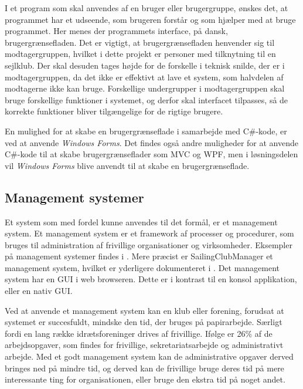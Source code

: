 I et program som skal anvendes af en bruger eller brugergruppe, ønskes det, at programmet har et udseende, som
brugeren forstår og som hjælper med at bruge programmet. Her menes der programmets interface, på dansk,
brugergrænsefladen. Det er vigtigt, at brugergrænsefladen henvender sig til modtagergruppen, hvilket i dette
projekt er personer med tilknytning til en sejlklub. Der skal desuden tages højde for de forskelle i teknisk
snilde, der er i modtagergruppen, da det ikke er effektivt at lave et system, som halvdelen af modtagerne ikke
kan bruge. Forskellige undergrupper i modtagergruppen skal bruge forskellige funktioner i systemet, og derfor
skal interfacet tilpasses, så de korrekte funktioner bliver tilgængelige for de rigtige brugere.

En mulighed for at skabe en brugergrænseflade i samarbejde med C\#-kode, er ved at anvende \textit{Windows
Forms}. Det findes også andre muligheder for at anvende C\#-kode til at skabe brugergrænseflader som
\ac{MVC} og \ac{WPF}, men i løsningsdelen vil
\textit{Windows Forms} blive anvendt til at skabe en brugergrænseflade.

\subsection{Management systemer}\label{subsec:management-systemer}

Et system som med fordel kunne anvendes til det formål, er et management system. Et management system er et
framework af processer og procedurer, som bruges til administration af frivillige organisationer og
virksomheder. Eksempler på management systemer findes i . Mere præcist er
SailingClubManager et management system, hvilket er yderligere dokumenteret i . Det
management system har en \ac{GUI} i web browseren. Dette er i kontrast til en konsol
applikation, eller en nativ \ac{GUI}.

Ved at anvende et management system kan en klub eller forening, forudsat at systemet er succesfuldt, mindske den
tid, der bruges på papirarbejde. Særligt fordi en lang række idrætsforeninger drives af frivillige. Ifølge
\citet{Frivilligrapporten} er 26\% af de arbejdsopgaver, som findes for frivillige, sekretariatsarbejde og
administrativt arbejde. Med et godt management system kan de administrative opgaver derved bringes ned på
mindre tid, og derved kan de frivillige bruge deres tid på mere interessante ting for organisationen, eller
bruge den ekstra tid på noget andet.


